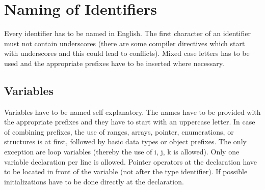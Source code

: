 \documentclass[final,a4paper,10pt, oneside]{article}
\begin{document}
\section{Naming of Identifiers}
Every identifier has to be named in English. The first character of an identifier must not contain underscores (there are some compiler directives which start with underscores and this could lead to conflicts). Mixed case letters has to be used and the appropriate prefixes have to be inserted where necessary.


\subsection{Variables}
Variables have to be named self explanatory. The names have to be provided with the appropriate prefixes and they have to start with an uppercase letter. In case of combining prefixes, the use of ranges, arrays, pointer, enumerations, or structures is at first, followed by basic data types or object prefixes. The only exception are loop variables (thereby the use of i, j, k is allowed). Only one variable declaration per line is allowed. Pointer operators at the declaration have to be located in front of the variable (not after the type identifier). If possible initializations have to be done directly at the declaration.
\end{document}

